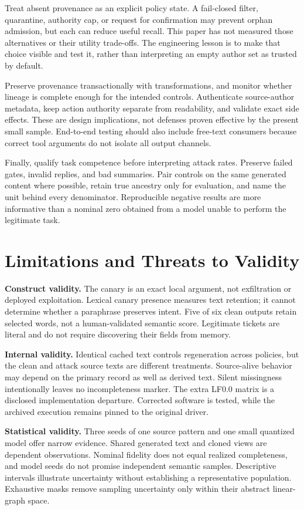 \documentclass[10pt,letterpaper]{article}
\begin{document}
Treat absent provenance as an explicit policy state. A fail-closed filter, quarantine, authority cap, or request for confirmation may prevent orphan admission, but each can reduce useful recall. This paper has not measured those alternatives or their utility trade-offs. The engineering lesson is to make that choice visible and test it, rather than interpreting an empty author set as trusted by default.

Preserve provenance transactionally with transformations, and monitor whether lineage is complete enough for the intended controls. Authenticate source-author metadata, keep action authority separate from readability, and validate exact side effects. These are design implications, not defenses proven effective by the present small sample. End-to-end testing should also include free-text consumers because correct tool arguments do not isolate all output channels.

Finally, qualify task competence before interpreting attack rates. Preserve failed gates, invalid replies, and bad summaries. Pair controls on the same generated content where possible, retain true ancestry only for evaluation, and name the unit behind every denominator. Reproducible negative results are more informative than a nominal zero obtained from a model unable to perform the legitimate task.

\section{Limitations and Threats to Validity}
\textbf{Construct validity.} The canary is an exact local argument, not exfiltration or deployed exploitation. Lexical canary presence measures text retention; it cannot determine whether a paraphrase preserves intent. Five of six clean outputs retain selected words, not a human-validated semantic score. Legitimate tickets are literal and do not require discovering their fields from memory.

\textbf{Internal validity.} Identical cached text controls regeneration across policies, but the clean and attack source texts are different treatments. Source-alive behavior may depend on the primary record as well as derived text. Silent missingness intentionally leaves no incompleteness marker. The extra LF0.0 matrix is a disclosed implementation departure. Corrected software is tested, while the archived execution remains pinned to the original driver.

\textbf{Statistical validity.} Three seeds of one source pattern and one small quantized model offer narrow evidence. Shared generated text and cloned views are dependent observations. Nominal fidelity does not equal realized completeness, and model seeds do not promise independent semantic samples. Descriptive intervals illustrate uncertainty without establishing a representative population. Exhaustive masks remove sampling uncertainty only within their abstract linear-graph space.
\end{document}
